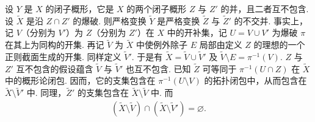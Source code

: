 \begin{numpara}[不可约分支的分离]\label{item:ag-2-3-5}
设 $Y$ 是 $X$ 的闭子概形，它是 $X$ 的两个闭子概形 $Z$ 与 $Z'$ 的并，且二者互不包含. 设 $\widetilde X$ 是沿 $Z\cap Z'$ 的爆破. 则严格变换 $\widetilde Y$ 是严格变换 $\widetilde Z$ 与 $\widetilde Z'$ 的不交并.
事实上，记 $V$（分别为 $V'$）为 $Z$（分别为 $Z'$）在 $X$ 中的开补集，记 $U=V\cup V'$ 为爆破 $\pi$ 在其上为同构的开集. 再记 $\widetilde V$ 为 $\widetilde X$ 中使例外除子 $E$ 局部由定义 $Z$ 的理想的一个正则截面生成的开集. 同样定义 $\widetilde V'$. 于是有 $\widetilde X=\widetilde V\cup\widetilde V'$ 及 $\widetilde V\setminus E=\pi^{-1}(V)$. $Z$ 与 $Z'$ 互不包含的假设蕴含 $\widetilde V$ 与 $\widetilde V'$ 也互不包含. 已知 $\widetilde Z$ 可等同于 $\pi^{-1}(U\cap Z)$ 在 $\widetilde X$ 中的概形论闭包. 因而，它的支集包含在 $\pi^{-1}(U\setminus V)$ 的拓扑闭包中，从而包含在 $\widetilde X\setminus\widetilde V'$ 中. 同理，$\widetilde Z'$ 的支集包含在 $\widetilde X\setminus\widetilde V$ 中. 而
\begin{align*}
(\widetilde X\setminus\widetilde V)\cap(\widetilde X\setminus\widetilde V')=\varnothing.
\end{align*}
\end{numpara}
